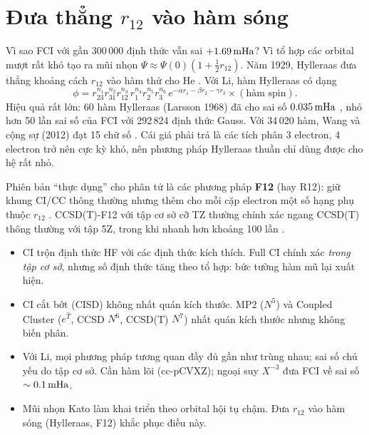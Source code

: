 \section{Đưa thẳng $r_{12}$ vào hàm sóng}
Vì sao FCI với gần 300\,000 định thức vẫn sai $+1.69\,\mathrm{mHa}$? Vì tổ hợp các orbital mượt rất khó tạo ra mũi nhọn $\Psi\approx\Psi(0)(1+\tfrac12r_{12})$. Năm 1929, Hylleraas đưa thẳng khoảng cách $r_{12}$ vào hàm thử cho He \cite{Hylleraas1929}. Với Li, hàm Hylleraas có dạng
\[
\phi=r_{23}^{n_1}r_{31}^{n_2}r_{12}^{n_3}\,r_1^{n_4}r_2^{n_5}r_3^{n_6}\,e^{-\alpha r_1-\beta r_2-\gamma r_3}\times(\text{hàm spin}).
\]
Hiệu quả rất lớn: 60 hàm Hylleraas (Larsson 1968) đã cho sai số $0.035\,\mathrm{mHa}$ \cite{Larsson1968}, nhỏ hơn 50 lần sai số của FCI với 292\,824 định thức Gauss. Với 34\,020 hàm, Wang và cộng sự (2012) đạt 15 chữ số \cite{Wang2012}. Cái giá phải trả là các tích phân 3 electron, 4 electron trở nên cực kỳ khó, nên phương pháp Hylleraas thuần chỉ dùng được cho hệ rất nhỏ.

Phiên bản ``thực dụng'' cho phân tử là các phương pháp \textbf{F12} (hay R12): giữ khung CI/CC thông thường nhưng thêm cho mỗi cặp electron một số hạng phụ thuộc $r_{12}$ \cite{Kutzelnigg1985,Hattig2012}. CCSD(T)-F12 với tập cơ sở cỡ TZ thường chính xác ngang CCSD(T) thông thường với tập 5Z, trong khi nhanh hơn khoảng 100 lần \cite{Adler2007}.

\begin{ghinho}
\begin{itemize}
\item CI trộn định thức HF với các định thức kích thích. Full CI chính xác \emph{trong tập cơ sở}, nhưng số định thức tăng theo tổ hợp: bức tường hàm mũ lại xuất hiện.
\item CI cắt bớt (CISD) không nhất quán kích thước. MP2 ($N^5$) và Coupled Cluster ($e^{\hat T}$, CCSD $N^6$, CCSD(T) $N^7$) nhất quán kích thước nhưng không biến phân.
\item Với Li, mọi phương pháp tương quan đầy đủ gần như trùng nhau; sai số chủ yếu do tập cơ sở. Cần hàm lõi (cc-pCVXZ); ngoại suy $X^{-3}$ đưa FCI về sai số $\sim0.1\,\mathrm{mHa}$.
\item Mũi nhọn Kato làm khai triển theo orbital hội tụ chậm. Đưa $r_{12}$ vào hàm sóng (Hylleraas, F12) khắc phục điều này.
\end{itemize}
\end{ghinho}
